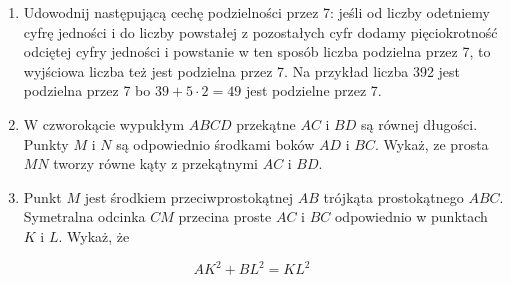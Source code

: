 \documentclass[10pt]{article}
\begin{document}
\begin{enumerate}
  \item Udowodnij następującą cechę podzielności przez 7: jeśli od liczby odetniemy cyfrę jedności i do liczby powstałej z pozostałych cyfr dodamy pięciokrotność odciętej cyfry jedności i powstanie w ten sposób liczba podzielna przez 7, to wyjściowa liczba też jest podzielna przez 7. Na przykład liczba 392 jest podzielna przez 7 bo \(39+5 \cdot 2=49\) jest podzielne przez 7.
  \item W czworokącie wypukłym \(A B C D\) przekątne \(A C\) i \(B D\) są równej długości. Punkty \(M\) i \(N\) są odpowiednio środkami boków \(A D\) i \(B C\). Wykaż, ze prosta \(M N\) tworzy równe kąty z przekątnymi \(A C\) i \(B D\).
  \item Punkt \(M\) jest środkiem przeciwprostokątnej \(A B\) trójkąta prostokątnego \(A B C\). Symetralna odcinka \(C M\) przecina proste \(A C\) i \(B C\) odpowiednio w punktach \(K\) i \(L\). Wykaż, że
\end{enumerate}

\[
A K^{2}+B L^{2}=K L^{2}
\]
\end{document}
